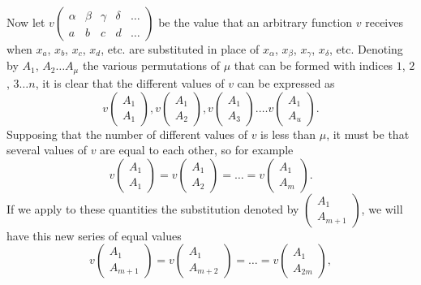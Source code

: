 \documentclass[oneside, 12 pt, leqno]{memoir}
\begin{document}
Now let \( v \left(\begin{array}{ccccc} \alpha & \beta & \gamma & \delta & \dots \\ a & b & c & d & \dots \end{array}\right)\) be the value that an arbitrary function \(v\) receives when \(x_a\), \(x_b\), \(x_c\), \(x_d\), etc. are substituted in place of \(x_\alpha\), \(x_\beta\), \(x_\gamma\), \(x_\delta\), etc.  Denoting by \(A_1\), \(A_2 \dots A_\mu\) the various permutations of \(\mu\) that can be formed with indices \(1\), \(2\), \(3 \dots n\), it is clear that the different values of \(v\) can be expressed as
\[v\left(\begin{array}{l}A_1 \\A_1\end{array}\right),  v\left(\begin{array}{l}A_1 \\A_2\end{array}\right), v\left(\begin{array}{l}A_1 \\A_3\end{array}\right) .\dots v\left(\begin{array}{l}A_1 \\A_u\end{array}\right).\]
Supposing that the number of different values of \(v\) is less than \(\mu\), it must be that several values of \(v\) are equal to each other, so for example
\[v\left(\begin{array}{l}A_1 \\A_1\end{array}\right)=v\left(\begin{array}{l}A_1 \\A_2\end{array}\right)=\dots=v\left(\begin{array}{l}A_1 \\A_m\end{array}\right).\]
If we apply to these quantities the substitution denoted by \(\left(\begin{array}{l}A_1 \\ A_{m+1}\end{array}\right)\), we will have this new series of equal values
\[v\left(\begin{array}{l}A_1 \\A_{m+1}\end{array}\right)=v\left(\begin{array}{l}A_1 \\A_{m+2}\end{array}\right)=\dots=v\left(\begin{array}{l}A_1 \\A_{2 m}\end{array}\right),\]
\end{document}
